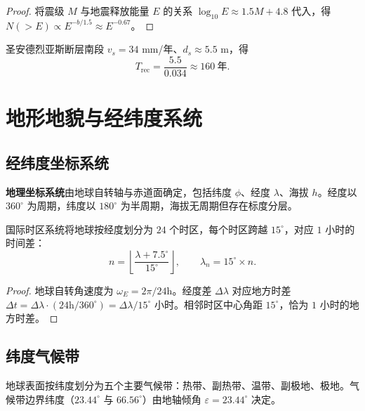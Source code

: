 \begin{proof}
将震级 $M$ 与地震释放能量 $E$ 的关系 $\log_{10}E\approx 1.5M+4.8$ 代入，得 $N(>E)\propto E^{-b/1.5}\approx E^{-0.67}$。
\end{proof}

\begin{example}[地震复发间隔的具体计算]\label{ex:geo_seismic_rec}
圣安德烈亚斯断层南段 $v_s=34$ mm/年、$d_s\approx 5.5$ m，得
\[
T_{\text{rec}}=\frac{5.5}{0.034}\approx 160\ \text{年}.
\]
\end{example}

\section{地形地貌与经纬度系统}
\label{sec:terrain_coordinates}

\subsection{经纬度坐标系统}

\begin{definition}[地理坐标系统]\label{def:geographic_coordinate}
\textbf{地理坐标系统}由地球自转轴与赤道面确定，包括纬度 $\phi$、经度 $\lambda$、海拔 $h$。经度以 $360^\circ$ 为周期，纬度以 $180^\circ$ 为半周期，海拔无周期但存在标度分层。
\end{definition}

\begin{proposition}[时区系统的周期性]\label{prop:timezone_periodicity}
国际时区系统将地球按经度划分为 $24$ 个时区，每个时区跨越 $15^\circ$，对应 $1$ 小时的时间差：
\[
n=\left\lfloor\frac{\lambda+7.5^\circ}{15^\circ}\right\rfloor,\qquad \lambda_n=15^\circ\times n.
\]
\end{proposition}

\begin{proof}
地球自转角速度为 $\omega_E=2\pi/24\text{h}$。经度差 $\Delta\lambda$ 对应地方时差 $\Delta t=\Delta\lambda\cdot(24\text{h}/360^\circ)=\Delta\lambda/15^\circ$ 小时。相邻时区中心角距 $15^\circ$，恰为 $1$ 小时的地方时差。
\end{proof}

\subsection{纬度气候带}

\begin{definition}[纬度气候带]\label{def:climate_zones}
地球表面按纬度划分为五个主要气候带：热带、副热带、温带、副极地、极地。气候带边界纬度（$23.44^\circ$ 与 $66.56^\circ$）由地轴倾角 $\varepsilon=23.44^\circ$ 决定。
\end{definition}

